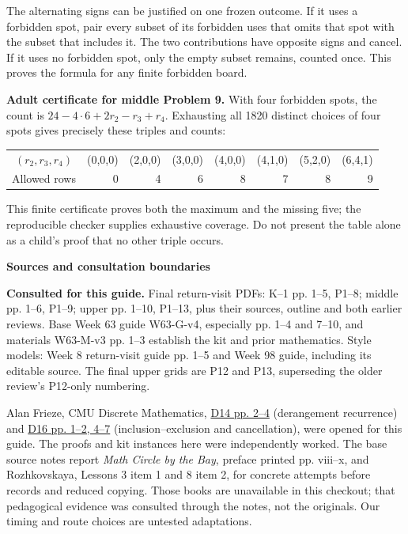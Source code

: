 \documentclass[11pt]{article}
\newcommand{\sub}[1]{\par\textbf{#1}\par}
\begin{document}
The alternating signs can be justified on one frozen outcome. If it uses a forbidden spot, pair every subset of its forbidden uses that omits that spot with the subset that includes it. The two contributions have opposite signs and cancel. If it uses no forbidden spot, only the empty subset remains, counted once. This proves the formula for any finite forbidden board.

\textbf{Adult certificate for middle Problem 9.} With four forbidden spots, the count is $24-4\cdot6+2r_2-r_3+r_4$. Exhausting all 1820 distinct choices of four spots gives precisely these triples and counts:
\begin{center}\small
\begin{tabular}{c|rrrrrrr}
$(r_2,r_3,r_4)$ &(0,0,0)&(2,0,0)&(3,0,0)&(4,0,0)&(4,1,0)&(5,2,0)&(6,4,1)\\
Allowed rows &0&4&6&8&7&8&9
\end{tabular}
\end{center}
This finite certificate proves both the maximum and the missing five; the reproducible checker supplies exhaustive coverage. Do not present the table alone as a child's proof that no other triple occurs.

\sub{Sources and consultation boundaries}
\small
\textbf{Consulted for this guide.} Final return-visit PDFs: K--1 pp. 1--5, P1--8; middle pp. 1--6, P1--9; upper pp. 1--10, P1--13, plus their sources, outline and both earlier reviews. Base Week 63 guide W63-G-v4, especially pp. 1--4 and 7--10, and materials W63-M-v3 pp. 1--3 establish the kit and prior mathematics. Style models: Week 8 return-visit guide pp. 1--5 and Week 98 guide, including its editable source. The final upper grids are P12 and P13, superseding the older review's P12-only numbering.

Alan Frieze, CMU Discrete Mathematics, \href{https://www.math.cmu.edu/~af1p/Teaching/DM/D14.pdf}{D14 pp. 2--4} (derangement recurrence) and \href{https://www.math.cmu.edu/~af1p/Teaching/DM/D16.pdf}{D16 pp. 1--2, 4--7} (inclusion--exclusion and cancellation), were opened for this guide. The proofs and kit instances here were independently worked. The base source notes report \emph{Math Circle by the Bay}, preface printed pp. viii--x, and Rozhkovskaya, Lessons 3 item 1 and 8 item 2, for concrete attempts before records and reduced copying. Those books are unavailable in this checkout; that pedagogical evidence was consulted through the notes, not the originals. Our timing and route choices are untested adaptations.
\end{document}
